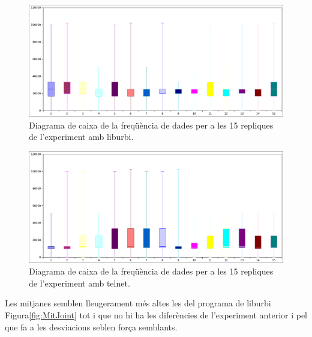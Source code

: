 \documentclass[12pt,a4paper,final,twoside]{article}
\begin{document}
\begin{figure}[H]
	\centering
    \includegraphics[scale=0.5]{images/JointC++Box.pdf}
	 \caption{Diagrama de caixa de la freqüència de dades per a les 15 repliques de l'experiment amb liburbi.}
  \label{fig:JointsC++Box}
\end{figure}
\begin{figure}[H]
	\centering
    \includegraphics[scale=0.5]{images/JointsPythonBox.pdf}
	 \caption{Diagrama de caixa de la freqüència de dades per a les 15 repliques de l'experiment amb telnet.}
  \label{fig:JointsPythonBox}
\end{figure}

Les mitjanes semblen lleugerament més altes les del programa de liburbi Figura\ref{fig:MitJoint} tot i que no hi ha les diferències de l'experiment anterior i pel que fa a les desviacions seblen força semblants.
\end{document}
